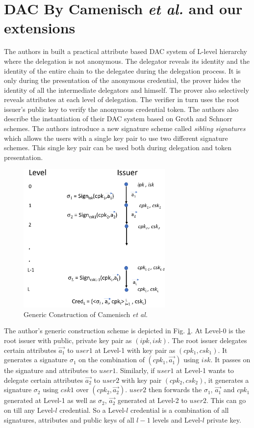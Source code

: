 \documentclass[journal]{IEEEtran}
\begin{document}
\section{DAC By Camenisch \textit{et al.} \cite{CamenischDD17} and our extensions} \label{camen}
The authors in \cite{CamenischDD17} built a practical attribute based DAC system of L-level hierarchy where the delegation is not anonymous. The delegator reveals its identity and the identity of the entire chain to the delegatee during the delegation process. It is only during the presentation of the anonymous credential, the prover hides the identity of all the intermediate delegators and himself. The prover also selectively reveals attributes at each level of delegation. The verifier in turn uses the root issuer's public key to verify the anonymous credential token. The authors also describe the instantiation of their DAC system based on Groth \cite{groth} and Schnorr \cite{rfc8235} schemes. The authors introduce a new signature scheme called \textit{sibling signatures} which allows the users with a single key pair to use two different signature schemes. This single key pair can be used both during delegation and token presentation.

\begin{figure}[htbp]
\centerline{\includegraphics[width=3in]{camen.png}}
\caption{Generic Construction of Camenisch \textit{et al.} \cite{CamenischDD17}}
\label{fig:genconst}
\end{figure}

The author's generic construction scheme is depicted in Fig. \ref{fig:genconst}. At Level-0 is the root issuer with public, private key pair as $(ipk,isk)$. The root issuer delegates certain attributes $\overrightarrow{a_1}$ to $user1$ at Level-1 with key pair as $(cpk_1, csk_1)$. It generates a signature $\sigma_1$ on the combination of $(cpk_1,\overrightarrow{a_1})$ using $isk$. It passes on the signature and attributes to  $user1$. Similarly, if $user1$ at Level-1 wants to delegate certain attributes $\overrightarrow{a_2}$ to $user2$ with key pair $(cpk_2, csk_2)$, it generates a signature $\sigma_2$ using $csk1$ over $(cpk_2,\overrightarrow{a_2})$. $user2$ then forwards the $\sigma_1$, $\overrightarrow{a_1}$ and $cpk_1$ generated at Level-1 as well as $\sigma_2$, $\overrightarrow{a_2}$ generated at Level-2 to $user2$. This can go on till any Level-$l$ credential. So a Level-$l$ credential is a combination of all signatures, attributes and public keys of all $l-1$ levels and Level-$l$ private key.
\end{document}
